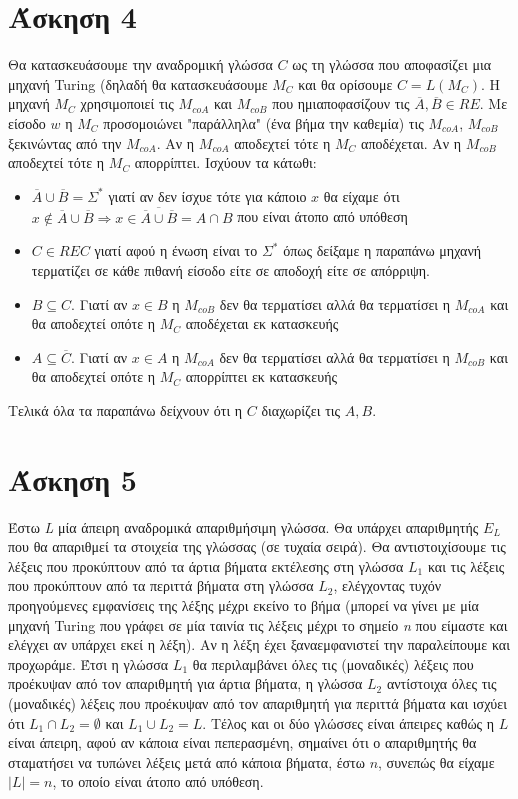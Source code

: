 \documentclass[11pt]{article}
\begin{document}
\section*{Άσκηση 4}
Θα κατασκευάσουμε την αναδρομική γλώσσα $C$ ως τη γλώσσα που αποφασίζει μια μηχανή Turing 
(δηλαδή θα κατασκευάσουμε $M_C$ και θα ορίσουμε $C=L(M_C)$. Η μηχανή $M_C$
χρησιμοποιεί τις $M_{coA}$ και $M_{coB}$ που ημιαποφασίζουν τις $\overline{A},\overline{B}\in RE$.
Με είσοδο $w$ η $M_C$ προσομοιώνει "παράλληλα" (ένα βήμα την καθεμία) τις $M_{coA}$, $M_{coB}$
ξεκινώντας από την $M_{coA}$. Αν η $M_{coA}$ αποδεχτεί τότε η $M_C$ αποδέχεται. Αν η $M_{coB}$ αποδεχτεί
τότε η $M_C$ απορρίπτει. Ισχύουν τα κάτωθι:
\begin{itemize}
  \item  $\overline{A}\cup \overline{B} = \Sigma^*$ γιατί αν δεν ίσχυε τότε για κάποιο $x$ θα είχαμε ότι
    $x\notin\overline{A}\cup \overline{B} \Rightarrow x\in\overline{\overline{A}\cup \overline{B}}=A\cap B$
    που είναι άτοπο από υπόθεση
  \item $C\in REC$ γιατί αφού η ένωση είναι το $\Sigma^*$ όπως δείξαμε η παραπάνω μηχανή τερματίζει σε 
    κάθε πιθανή είσοδο είτε σε αποδοχή είτε σε απόρριψη.
  \item $B\subseteq C$. Γιατί αν $x\in B$ η $M_{coB}$ δεν θα τερματίσει αλλά θα τερματίσει η  
    $M_{coA}$ και θα αποδεχτεί οπότε η $M_C$ αποδέχεται εκ κατασκευής
  \item $A\subseteq \overline{C}$. Γιατί αν $x\in A$ η $M_{coA}$ δεν θα τερματίσει αλλά θα τερματίσει η  
    $M_{coB}$ και θα αποδεχτεί οπότε η $M_C$ απορρίπτει εκ κατασκευής
\end{itemize}
Τελικά όλα τα παραπάνω δείχνουν ότι η $C$ διαχωρίζει τις $A,B$.



\section*{Άσκηση 5}
Έστω \textit{L} μία άπειρη αναδρομικά απαριθμήσιμη γλώσσα. Θα υπάρχει απαριθμητής $E_L$ που θα απαριθμεί τα στοιχεία της γλώσσας (σε τυχαία σειρά). Θα αντιστοιχίσουμε τις λέξεις που προκύπτουν από τα άρτια βήματα εκτέλεσης στη γλώσσα $L_1$ και τις λέξεις που προκύπτουν από τα περιττά βήματα στη γλώσσα $L_2$, ελέγχοντας τυχόν προηγούμενες εμφανίσεις της λέξης μέχρι εκείνο το βήμα (μπορεί να γίνει με μία μηχανή Turing που γράφει σε μία ταινία τις λέξεις μέχρι το σημείο \textit{n} που είμαστε και ελέγχει αν υπάρχει εκεί η λέξη). Αν η λέξη έχει ξαναεμφανιστεί την παραλείπουμε και προχωράμε. Έτσι η γλώσσα $L_1$ θα περιλαμβάνει όλες τις (μοναδικές) λέξεις που προέκυψαν από τον απαριθμητή για άρτια βήματα, η γλώσσα $L_2$ αντίστοιχα όλες τις (μοναδικές) λέξεις που προέκυψαν από τον απαριθμητή για περιττά βήματα και ισχύει ότι $L_1 \cap L_2 = \emptyset$ και $L_1 \cup L_2 = L$.
Τέλος και οι δύο γλώσσες είναι άπειρες καθώς η $L$ είναι άπειρη, αφού αν κάποια είναι πεπερασμένη, σημαίνει ότι ο απαριθμητής θα σταματήσει να τυπώνει λέξεις μετά από κάποια βήματα, έστω $n$, συνεπώς θα είχαμε $|L|=n$, το οποίο είναι άτοπο από υπόθεση.
\end{document}
